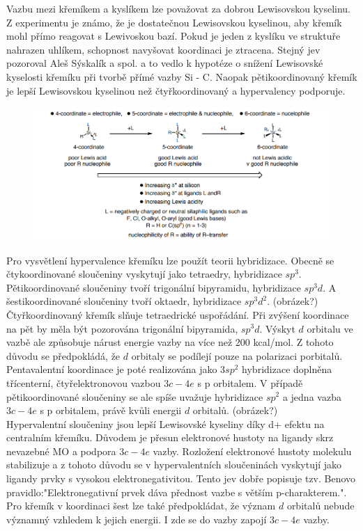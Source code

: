 \documentclass[
  digital, %
  table,   %
  lof,     %
  lot,     %
]{fithesis3}
\begin{document}
Vazbu mezi křemíkem a kyslíkem lze považovat za dobrou Lewisovskou kyselinu. Z experimentu je známo, že  je dostatečnou Lewisovskou kyselinou, aby křemík mohl přímo reagovat s Lewivoskou bazí. Pokud je jeden z kyslíku ve struktuře nahrazen uhlíkem, schopnost navyšovat koordinaci je ztracena. Stejný jev pozoroval Aleš Sýskalík a spol. \cite{Styskalik2015thesis} a to vedlo k hypotéze o snížení Lewisovské kyselosti křemíku při tvorbě přímé vazby Si - C. Naopak pětikoordinovaný křemík je lepší Lewisovskou kyselinou než čtyřkoordinovaný a hypervalency podporuje.\cite{Wagler2014}\\

\begin{figure}[h!]
\caption{\cite{hypervalentsiliconmacmillangroup2005}}
  \center
  \includegraphics[width=12cm]{schema_silicophosphates.png}
  \label{schema_silicon_coordinate}
  \end{figure}

Pro vysvětlení hypervalence křemíku lze použít teorii hybridizace. Obecně se čtykoordinované sloučeniny vyskytují jako tetraedry, hybridizace $sp^3$. Pětikoordinované sloučeniny tvoří trigonální bipyramidu, hybridizace $sp^3d$. A šestikoordinované sloučeniny tvoří oktaedr, hybridizace $sp^3d^2$. (obrázek?) \\

Čtyřkoordinovaný křemík slňuje tetraedrické uspořádání. Při zvýšení koordinace na pět by měla být pozorována trigonální bipyramida, $sp^3d$. Výskyt $d$ orbitalu ve vazbě ale způsobuje nárust energie vazby na více než 200 kcal/mol. Z tohoto důvodu se předpokládá, že $d$ orbitaly se podílejí pouze na polarizaci porbitalů. Pentavalentní koordinace je poté realizována jako $3sp^2$ hybridizace doplněna třícenterní, čtyřelektronovou vazbou $3c-4e$ s p orbitalem.
 V případě pětikoordinované sloučeniny se ale spíše uvažuje hybridizace $sp^2$ a jedna vazba $3c-4e$ s p orbitalem, právě kvůli energii $d$ orbitalů. (obrázek?) \\
 Hypervalentní sloučeniny jsou lepší Lewisovské kyseliny díky d+ efektu na centralním křemíku. Důvodem je přesun elektronové hustoty na ligandy skrz nevazebné MO a podpora $3c-4e$ vazby. Rozložení elektronové hustoty molekulu stabilizuje a z tohoto důvodu se v hypervalentních sloučeninách vyskytují jako ligandy prvky s vysokou elektronegativitou. Tento jev dobře popisuje tzv. Benovo pravidlo:"Elektronegativní prvek dáva přednost vazbe s větším p-charakterem."\cite{hypervalentsiliconmacmillangroup2005}.\\
Pro křemík v koordinaci šest lze také předpokládat, že význam $d$ orbitalů nebude významný vzhledem k jejich energii. I zde se do vazby zapojí $3c-4e$ vazby\cite{Wagler2014}.\\
\end{document}
